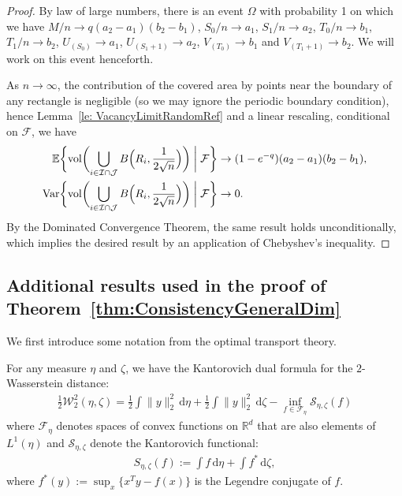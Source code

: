 \documentclass[11pt]{article}
\newcommand{\vol}{\mathrm{vol}}
\newcommand{\var}{\mathrm{Var}}
\begin{document}
\begin{proof}
By law of large numbers, there is an event $\Omega$ with probability 1 on which we have $M / n \to q(a_2-a_1)(b_2-b_1)$, $S_0 / n\to a_1$, $S_1/n\to a_2$, $T_0 / n\to b_1$, $T_1/n\to b_2$, $U_{(S_0)}\to a_1$, $U_{(S_1+1)}\to a_2$, $V_{(T_0)}\to b_1$ and $V_{(T_1+1)}\to b_2$.  We will work on this event henceforth. 

As $n\to\infty$, the contribution of the covered area by points near the boundary of any rectangle is negligible (so we may ignore the periodic boundary condition), hence Lemma~\ref{le: VacancyLimitRandomRef} and a linear rescaling, conditional on $\mathcal{F}$, we have 
\begin{align*}
\mathbb{E}\biggl\{\vol\biggl(\bigcup_{i\in\mathcal{I}\cap\mathcal{J}}B\Bigl(R_i, \frac{1}{2\sqrt{n}}\Bigr)\biggr) \biggm | \mathcal{F}\biggr\} &\to (1-e^{-q})(a_2-a_1)(b_2-b_1),\\
\var\biggl\{\vol\biggl(\bigcup_{i\in\mathcal{I}\cap\mathcal{J}}B\Bigl(R_i, \frac{1}{2\sqrt{n}}\Bigr)\biggr) \biggm | \mathcal{F}\biggr\} &\to 0.
\end{align*}
By the Dominated Convergence Theorem, the same result holds unconditionally, which implies the desired result by an application of Chebyshev's inequality.
\end{proof}


\subsection{Additional results used in the proof of Theorem~\ref{thm:ConsistencyGeneralDim}}
We first introduce some notation from the optimal transport theory. 

For any measure $\eta$ and $\zeta$, we have the Kantorovich dual formula for the $2$-Wasserstein distance:
\begin{align*}
 \frac{1}{2}\mathcal{W}_2^2(\eta, \zeta) = \frac{1}{2}\int \|y\|_2^2 \, \mathrm{d}\eta +  \frac{1}{2}\int \|y\|_2^2 \, \mathrm{d}\zeta - \inf_{f\in \mathcal{F}_\eta} \mathcal{S}_{\eta, \zeta}(f)
\end{align*}
where $\mathcal{F}_\eta$ denotes spaces of convex functions on $\mathbb{R}^d$ that are also elements of $L^1(\eta)$ and $\mathcal{S}_{\eta, \zeta}$ denote the Kantorovich functional:
\begin{align}
    S_{\eta, \zeta}(f) := \int f \, \mathrm{d}\eta + \int f^* \, \mathrm{d} \zeta, \label{eq:KantorovichPotentialFunctional}
\end{align}
where $f^*(y):= \sup_x\bigl\{x^Ty - f(x)\bigr\}$ is the Legendre conjugate of $f$.
\end{document}
